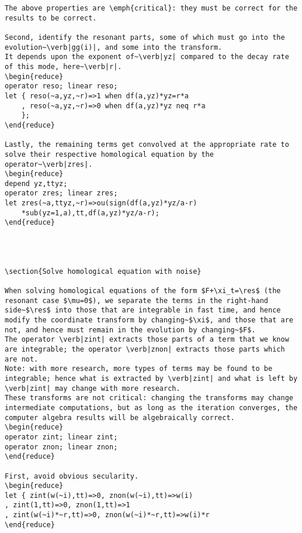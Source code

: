 \documentclass[11pt,a5paper]{article}
\newcommand{\res}{\operatorname{Res}}
\begin{document}
\begin{reduce}
\begin{verbatim}
The above properties are \emph{critical}: they must be correct for the results to be correct.

Second, identify the resonant parts, some of which must go into the evolution~\verb|gg(i)|, and some into the transform.
It depends upon the exponent of~\verb|yz| compared to the decay rate of this mode, here~\verb|r|.
\begin{reduce}
operator reso; linear reso;
let { reso(~a,yz,~r)=>1 when df(a,yz)*yz=r*a
    , reso(~a,yz,~r)=>0 when df(a,yz)*yz neq r*a
    };
\end{reduce}

Lastly, the remaining terms get convolved at the appropriate rate to solve their respective homological equation by the operator~\verb|zres|.
\begin{reduce}
depend yz,ttyz;
operator zres; linear zres;
let zres(~a,ttyz,~r)=>ou(sign(df(a,yz)*yz/a-r)
    *sub(yz=1,a),tt,df(a,yz)*yz/a-r);
\end{reduce}




\section{Solve homological equation with noise}

When solving homological equations of the form $F+\xi_t=\res$ (the resonant case $\mu=0$), we separate the terms in the right-hand side~$\res$ into those that are integrable in fast time, and hence modify the coordinate transform by changing~$\xi$, and those that are not, and hence must remain in the evolution by changing~$F$.  
The operator \verb|zint| extracts those parts of a term that we know are integrable; the operator \verb|znon| extracts those parts which are not.
Note: with more research, more types of terms may be found to be integrable; hence what is extracted by \verb|zint| and what is left by \verb|zint| may change with more research.
These transforms are not critical: changing the transforms may change intermediate computations, but as long as the iteration converges, the computer algebra results will be algebraically correct.
\begin{reduce}
operator zint; linear zint;
operator znon; linear znon;
\end{reduce}

First, avoid obvious secularity.
\begin{reduce}
let { zint(w(~i),tt)=>0, znon(w(~i),tt)=>w(i)
, zint(1,tt)=>0, znon(1,tt)=>1
, zint(w(~i)*~r,tt)=>0, znon(w(~i)*~r,tt)=>w(i)*r
\end{reduce}


\end{verbatim}
\end{reduce}
\end{document}
